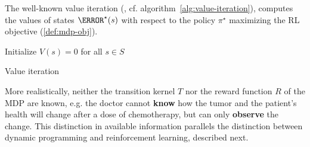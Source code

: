 The well-known value iteration (\cite{sutton}, cf. algorithm~\ref{alg:value-iteration}), computes the values of states $\V^{\star}(s)$ with respect to the policy $\pi^{\star}$ maximizing the RL objective (\ref{def:mdp-obj}). 

\begin{algorithm}
    Initialize $V(s) = 0$ for all $s \in S$ \\
    \caption{Value iteration}\label{alg:value-iteration}
\end{algorithm}

More realistically, neither the transition kernel $T$ nor the reward function $R$ of the MDP are known, e.g. the doctor cannot \textbf{know} how the tumor and the patient's health will change after a dose of chemotherapy, but can only \textbf{observe} the change.
This distinction in available information parallels the distinction between dynamic programming and reinforcement learning, described next. 

